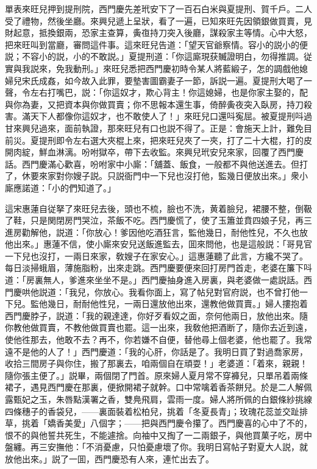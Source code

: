 單表來旺兒押到提刑院，西門慶先差玳安下了一百石白米與夏提刑、賀千戶。二人受了禮物，然後坐廳。來興兒遞上呈狀，看了一遍，已知來旺先因領銀做買賣，見財起意，抵換銀兩，恐家主查算，夤亱持刀突入後廳，謀殺家主等情。心中大怒，把來旺叫到當廳，審問這件事。這來旺兒告道：「望天官爺察情。容小的説小的便説；不容小的説，小的不敢説。」夏提刑道：「你這廝現获贓證明白，勿得推調。従實與我説來，免我動刑。」來旺兒悉把西門慶初時令某人將藍緞子，怎的調戲他媳婦兒宋氏成姦，如今故入此罪，要墊害圖霸妻子一節，訴説一遍。夏提刑大喝了一聲，令左右打嘴巴，説：「你這奴才，欺心背主！你這媳婦，也是你家主娶的，配與你為妻，又把資本與你做買賣；你不思報本還生事，倚醉夤夜突入臥房，持刀殺害。滿天下人都像你這奴才，也不敢使人了！」來旺兒口還呌寃屈。被夏提刑呌過甘來興兒過來，面前執證，那來旺兒有口也説不得了。正是：會施天上計，難免目前災。夏提刑即令左右選大夾棍上來，把來旺兒夾了一夾，打了二十大棍，打的皮開肉綻，鮮血淋漓。吩咐獄卒，帶下去收監。來興兒玳安兒來家，回覆了西門慶話。西門慶滿心歡喜，吩咐家中小廝：「舖蓋、飯食，一般都不與他送進去。但打了，休要來家對你嫂子説。只説衙門中一下兒也沒打他，監幾日便放出來。」衆小廝應諾道：「小的們知道了。」

這宋惠蓮自従拏了來旺兒去後，頭也不梳，臉也不洗，黄着臉兒，裙腰不整，倒靸了鞋，只是関閉房門哭泣，茶飯不吃。西門慶慌了，使了玉簫並賁四娘子兒，再三進房勸解他，説道：「你放心！爹因他吃酒狂言，監他幾日，耐他性兒，不久也放他出來。」惠蓮不信，使小廝來安兒送飯進監去，囬來問他，也是這般説：「哥見官一下兒也沒打，一兩日來家，敎嫂子在家安心。」這惠蓮聽了此言，方纔不哭了。每日淡掃蛾眉，薄施脂粉，出來走跳。西門慶要便來回打房門首走，老婆在簾下呌道：「房裏無人，爹進來坐坐不是。」西門慶抽身進入房裏，與老婆做一處説話。西門慶哄他説道：「我兒，你放心。我看你面上，寫了帖兒對官府説，也不曾打他一下兒。監他幾日，耐耐他性兒，一兩日還放他出來，還教他做買賣。」婦人摟抱着西門慶脖子，説道：「我的親達達，你好歹看奴之面，奈何他兩日，放他出來。隨你教他做買賣，不教他做買賣也罷。這一出來，我敎他把酒断了，隨你去近到遠，使他徃那去，他敢不去？再不，你若嫌不自便，替他尋上個老婆，他也罷了。我常遠不是他的人了！」西門慶道：「我的心肝，你話是了。我明日買了對過喬家房，收拾三間房子與你住，搬了那裏去，咱兩個自在頑耍！」老婆道：「着來，親親！隨你張主便了。」説畢，兩個閉了門首。原來婦人夏月常不穿褲兒，只單吊着兩條裙子，遇見西門慶在那裏，便掀開裙子就幹。口中常噙着香茶餅兒。於是二人解佩露甄妃之玉，朱唇點漢署之香，雙鳧飛肩，雲雨一度。婦人將所佩的白銀條紗挑線四條穗子的香袋兒，——裏面裝着松柏兒，挑着「冬夏長青」；玫瑰花蕊並交趾排草，挑着「嬌香美愛」八個字；——把與西門慶令攥了。西門慶喜的心中了不的，恨不的與他誓共死生，不能遽捨。向袖中又掏了一二兩銀子，與他買菓子吃，房中盤纏。再三安撫他：「不消憂慮，只怕憂慮壞了你。我明日寫帖子對夏大人説，就放他出來。」説了一囬，西門慶恐有人來，連忙出去了。

